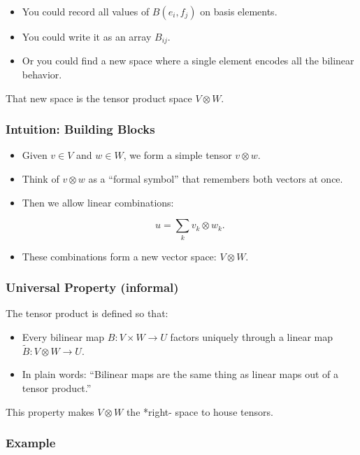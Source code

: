 \documentclass[
  letterpaper,
  DIV=11,
  numbers=noendperiod]{scrreprt}
\providecommand{\tightlist}{%
  \setlength{\itemsep}{0pt}\setlength{\parskip}{0pt}}
\begin{document}
\begin{itemize}
\tightlist
\item
  You could record all values of \(B(e_i, f_j)\) on basis elements.
\item
  You could write it as an array \(B_{ij}\).
\item
  Or you could find a new space where a single element encodes all the
  bilinear behavior.
\end{itemize}

That new space is the tensor product space \(V \otimes W\).

\subsubsection{Intuition: Building
Blocks}\label{intuition-building-blocks}

\begin{itemize}
\item
  Given \(v \in V\) and \(w \in W\), we form a simple tensor
  \(v \otimes w\).
\item
  Think of \(v \otimes w\) as a ``formal symbol'' that remembers both
  vectors at once.
\item
  Then we allow linear combinations:

  \[
  u = \sum_k v_k \otimes w_k.
  \]
\item
  These combinations form a new vector space: \(V \otimes W\).
\end{itemize}

\subsubsection{Universal Property
(informal)}\label{universal-property-informal}

The tensor product is defined so that:

\begin{itemize}
\tightlist
\item
  Every bilinear map \(B: V \times W \to U\) factors uniquely through a
  linear map \(\tilde{B}: V \otimes W \to U\).
\item
  In plain words: ``Bilinear maps are the same thing as linear maps out
  of a tensor product.''
\end{itemize}

This property makes \(V \otimes W\) the *right- space to house tensors.

\subsubsection{Example}\label{example}
\end{document}
